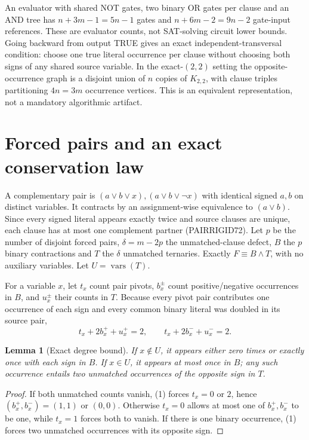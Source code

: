 \documentclass[11pt]{article}
\newtheorem{lemma}{Lemma}
\begin{document}
An evaluator with shared NOT gates, two binary OR gates per clause and an AND tree has $n+3m-1=5n-1$ gates and $n+6m-2=9n-2$ gate-input references. These are evaluator counts, not SAT-solving circuit lower bounds. Going backward from output TRUE gives an exact independent-transversal condition: choose one true literal occurrence per clause without choosing both signs of any shared source variable. In the exact-$(2,2)$ setting the opposite-occurrence graph is a disjoint union of $n$ copies of $K_{2,2}$, with clause triples partitioning $4n=3m$ occurrence vertices. This is an equivalent representation, not a mandatory algorithmic artifact.

\section{Forced pairs and an exact conservation law}
A complementary pair is $(a\vee b\vee x),(a\vee b\vee\neg x)$ with identical signed $a,b$ on distinct variables. It contracts by an assignment-wise equivalence to $(a\vee b)$. Since every signed literal appears exactly twice and source clauses are unique, each clause has at most one complement partner (PAIRRIGID72). Let $p$ be the number of disjoint forced pairs, $\delta=m-2p$ the unmatched-clause defect, $B$ the $p$ binary contractions and $T$ the $\delta$ unmatched ternaries. Exactly $F\equiv B\wedge T$, with no auxiliary variables. Let $U=\operatorname{vars}(T)$.

For a variable $x$, let $t_x$ count pair pivots, $b_x^\pm$ count positive/negative occurrences in $B$, and $u_x^\pm$ their counts in $T$. Because every pivot pair contributes one occurrence of each sign and every common binary literal was doubled in its source pair,
\[
t_x+2b_x^++u_x^+=2,\qquad t_x+2b_x^-+u_x^-=2.\tag{1}
\]
\begin{lemma}[Exact degree bound]
If $x\notin U$, it appears either zero times or exactly once with each sign in $B$. If $x\in U$, it appears at most once in $B$; any such occurrence entails two unmatched occurrences of the opposite sign in $T$.
\end{lemma}
\begin{proof} If both unmatched counts vanish, (1) forces $t_x=0$ or $2$, hence $(b_x^+,b_x^-)=(1,1)$ or $(0,0)$. Otherwise $t_x=0$ allows at most one of $b_x^+,b_x^-$ to be one, while $t_x=1$ forces both to vanish. If there is one binary occurrence, (1) forces two unmatched occurrences with its opposite sign. \end{proof}
\end{document}
